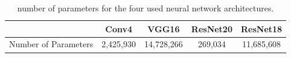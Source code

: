 \begin{table}[ht!]
  \centering
  \begin{tabular}{lcccc}
    \cline{2-5}
                         & \textbf{Conv4} & \textbf{VGG16} & \textbf{ResNet20} & \textbf{ResNet18} \\ \hline
    Number of Parameters & 2,425,930      & 14,728,266     & 269,034           & 11,685,608        \\ \hline
  \end{tabular}
  \caption{ number of parameters for the four used neural network architectures.}
  \label{tab:intro:networks_size}
\end{table}